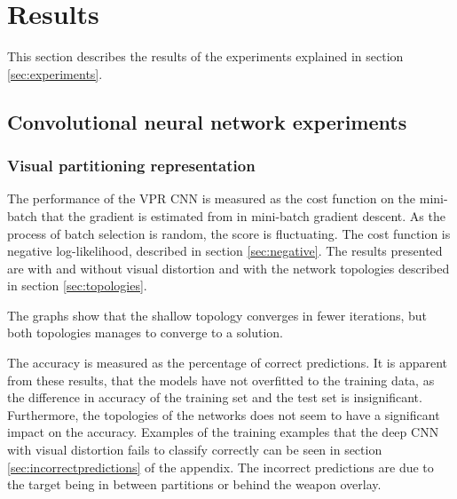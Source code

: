 
\section{Results}
This section describes the results of the experiments explained in section \ref{sec:experiments}.

\label{sec:results}

\subsection{Convolutional neural network experiments}
\subsubsection{Visual partitioning representation}
The performance of the VPR CNN is measured as the cost function on the mini-batch that the gradient is estimated from in mini-batch gradient descent. As the process of batch selection is random, the score is fluctuating. The cost function is negative log-likelihood, described in section \ref{sec:negative}.
The results presented are with and without visual distortion and with the network topologies described in section \ref{sec:topologies}.


\noindent
The graphs show that the shallow topology converges in fewer iterations, but both topologies manages to converge to a solution. 


\noindent
The accuracy is measured as the percentage of correct predictions. It is apparent from these results, that the models have not overfitted to the training data, as the difference in accuracy of the training set and the test set is insignificant. Furthermore, the topologies of the networks does not seem to have a significant impact on the accuracy. Examples of the training examples that the deep CNN with visual distortion fails to classify correctly can be seen in section \ref{sec:incorrectpredictions} of the appendix. The incorrect predictions are due to the target being in between partitions or behind the weapon overlay.

%
%


